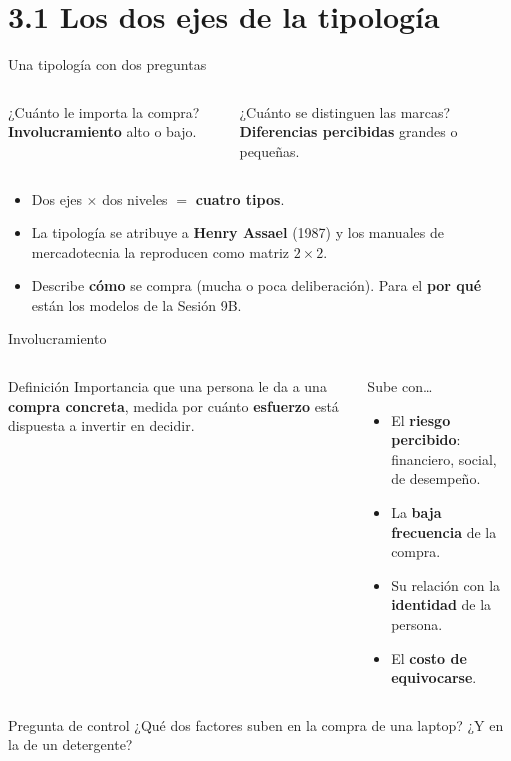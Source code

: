 \documentclass[aspectratio=169,xcolor=dvipsnames]{beamer}
\begin{document}
\section[Dos ejes]{3.1 Los dos ejes de la tipología}

\begin{frame}{Una tipología con dos preguntas}
\begin{columns}[T]
  \begin{block}{¿Cuánto le importa la compra?}
    \small \textbf{Involucramiento} alto o bajo.
  \end{block}
  \begin{block}{¿Cuánto se distinguen las marcas?}
    \small \textbf{Diferencias percibidas} grandes o pequeñas.
  \end{block}
\end{columns}
\vspace{6pt}
\begin{itemize}
  \small
  \item Dos ejes $\times$ dos niveles $=$ \textbf{cuatro tipos}.
  \item La tipología se atribuye a \textbf{Henry Assael} (1987) y los manuales de mercadotecnia la reproducen como matriz $2\times2$.
  \item Describe \textbf{cómo} se compra (mucha o poca deliberación). Para el \textbf{por qué} están los modelos de la Sesión 9B.
\end{itemize}
\end{frame}

\begin{frame}{Involucramiento}
\begin{columns}[T]
  \begin{block}{Definición}
    \small Importancia que una persona le da a una \textbf{compra concreta}, medida por cuánto \textbf{esfuerzo} está dispuesta a invertir en decidir.
  \end{block}
  \begin{alertblock}{Sube con\ldots}
    \small
    \begin{itemize}
      \item El \textbf{riesgo percibido}: financiero, social, de desempeño.
      \item La \textbf{baja frecuencia} de la compra.
      \item Su relación con la \textbf{identidad} de la persona.
      \item El \textbf{costo de equivocarse}.
    \end{itemize}
  \end{alertblock}
\end{columns}
\begin{exampleblock}{Pregunta de control}
  \footnotesize ¿Qué dos factores suben en la compra de una laptop? ¿Y en la de un detergente?
\end{exampleblock}
\end{frame}
\end{document}
